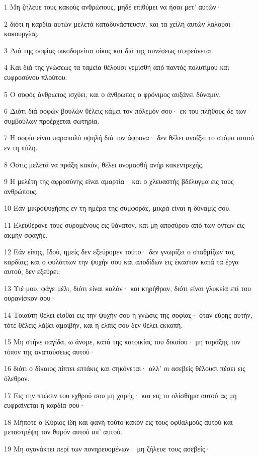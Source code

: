 \par 1 Μη ζήλευε τους κακούς ανθρώπους, μηδέ επιθύμει να ήσαι μετ' αυτών·
\par 2 διότι η καρδία αυτών μελετά καταδυνάστευσιν, και τα χείλη αυτών λαλούσι κακουργίας.
\par 3 Διά της σοφίας οικοδομείται οίκος και διά της συνέσεως στερεόνεται.
\par 4 Και διά της γνώσεως τα ταμεία θέλουσι γεμισθή από παντός πολυτίμου και ευφροσύνου πλούτου.
\par 5 Ο σοφός άνθρωπος ισχύει, και ο άνθρωπος ο φρόνιμος αυξάνει δύναμιν.
\par 6 Διότι διά σοφών βουλών θέλεις κάμει τον πόλεμόν σου· εκ του πλήθους δε των συμβούλων προέρχεται σωτηρία.
\par 7 Η σοφία είναι παραπολύ υψηλή διά τον άφρονα· δεν θέλει ανοίξει το στόμα αυτού εν τη πύλη.
\par 8 Όστις μελετά να πράξη κακόν, θέλει ονομασθή ανήρ κακεντρεχής.
\par 9 Η μελέτη της αφροσύνης είναι αμαρτία· και ο χλευαστής βδέλυγμα εις τους ανθρώπους.
\par 10 Εάν μικροψυχήσης εν τη ημέρα της συμφοράς, μικρά είναι η δύναμίς σου.
\par 11 Ελευθέρονε τους συρομένους εις θάνατον, και μη αποσύρου από των όντων εις ακμήν σφαγής.
\par 12 Εάν είπης, Ιδού, ημείς δεν εξεύρομεν τούτο· δεν γνωρίζει ο σταθμίζων τας καρδίας; και ο φυλάττων την ψυχήν σου και αποδίδων εις έκαστον κατά τα έργα αυτού, δεν εξεύρει;
\par 13 Υιέ μου, φάγε μέλι, διότι είναι καλόν· και κηρήθραν, διότι είναι γλυκεία επί του ουρανίσκον σου·
\par 14 Τοιαύτη θέλει είσθαι εις την ψυχήν σου η γνώσις της σοφίας· όταν εύρης αυτήν, τότε θέλεις λάβει αμοιβήν, και η ελπίς σου δεν θέλει εκκοπή.
\par 15 Μη στήνε παγίδα, ω άνομε, κατά της κατοικίας του δικαίου· μη ταράξης τον τόπον της αναπαύσεως αυτού·
\par 16 διότι ο δίκαιος πίπτει επτάκις και σηκόνεται· αλλ' οι ασεβείς θέλουσι πέσει εις όλεθρον.
\par 17 Εις την πτώσιν του εχθρού σου μη χαρής· και εις το ολίσθημα αυτού ας μη ευφραίνεται η καρδία σου·
\par 18 Μήποτε ο Κύριος ίδη και φανή τούτο κακόν εις τους οφθαλμούς αυτού και μεταστρέψη τον θυμόν αυτού απ' αυτού.
\par 19 Μη αγανάκτει περί των πονηρευομένων· μη ζήλευε τους ασεβείς·
